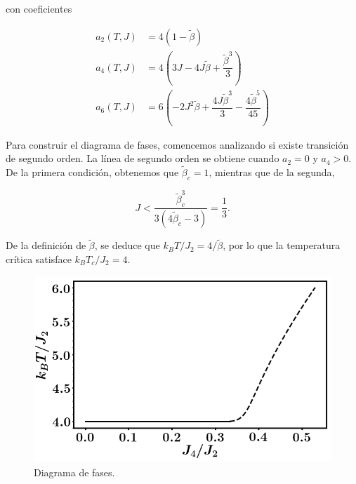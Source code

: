 \documentclass[10pt]{article}
\begin{document}
con coeficientes 

\begin{align*}
a_2(T,J) &= 4 (1-\tilde{\beta})\\
a_4(T,J) &= 4\left( 3J - 4J\tilde{\beta} + \dfrac{\tilde{\beta}^3}{3} \right) \\
a_6(T,J) &= 6 \left(-2 J^2\tilde{\beta} + \dfrac{4J\tilde{\beta}^3}{3} - \dfrac{4\tilde{\beta}^5}{45}\right)
\end{align*}

Para construir el diagrama de fases, comencemos analizando si existe transici\'on de segundo orden. La l\'inea de segundo orden se obtiene cuando $a_2=0$ y $a_4>0$. De la primera condici\'on, obtenemos que $\tilde{\beta}_c = 1$, mientras que de la segunda,


\begin{equation}
J < \dfrac{\tilde{\beta}_c^3}{3(4\tilde{\beta}_c-3)}=\dfrac{1}{3}.
\end{equation}

De la definici\'on de $\tilde{\beta}$, se deduce que $k_B T/J_2 = 4 /\tilde{\beta}$, por lo que la temperatura cr\'itica satisface $k_B T_c/J_2 = 4$.

\begin{figure}
\centering
\includegraphics[scale=0.5]{phase_diagram.png}
\caption{Diagrama de fases.}
\end{figure}
\end{document}
